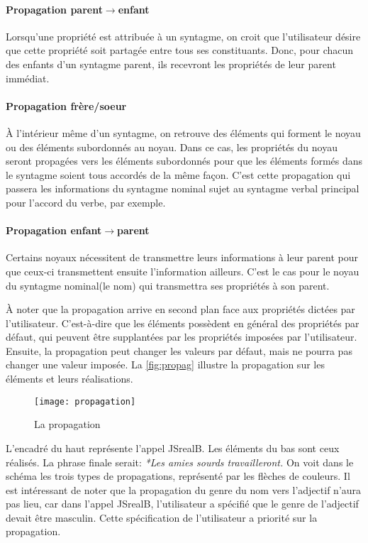 \documentclass[11pt]{article} %
\newcommand{\system}[1]{\textsf{#1}}
\newcommand{\JSB}{\system{JSrealB}}
\newcommand{\real}[1]{\emph{#1}}
\begin{document}
\paragraph{Propagation parent$\rightarrow$enfant}

Lorsqu'une propriété est attribuée à un syntagme, on croit que l'utilisateur
désire que cette propriété soit partagée entre tous ses constituants.
Donc, pour chacun des enfants d'un syntagme parent, ils recevront
les propriétés de leur parent immédiat.

\paragraph{Propagation frère/soeur}

À l'intérieur même d'un syntagme, on retrouve des éléments qui forment
le noyau ou des éléments subordonnés au noyau. Dans ce cas, les propriétés
du noyau seront propagées vers les éléments subordonnés pour que les
éléments formés dans le syntagme soient tous accordés de la même façon.
C'est cette propagation qui passera les informations du syntagme nominal
sujet au syntagme verbal principal pour l'accord du verbe, par exemple. 

\paragraph{Propagation enfant$\rightarrow$parent}

Certains noyaux nécessitent de transmettre leurs informations à leur
parent pour que ceux-ci transmettent ensuite l'information ailleurs.
C'est le cas pour le noyau du syntagme nominal(le nom) qui transmettra
ses propriétés à son parent.

À noter que la propagation arrive en second plan face aux propriétés
dictées par l'utilisateur. C'est-à-dire que les éléments possèdent
en général des propriétés par défaut, qui peuvent être supplantées
par les propriétés imposées par l'utilisateur. Ensuite, la propagation
peut changer les valeurs par défaut, mais ne pourra pas changer une
valeur imposée. La \autoref{fig:propag} illustre la propagation
sur les éléments et leurs réalisations.
\begin{figure}
\centering
\caption{La propagation}
\label{fig:propag}
\texttt{[image: propagation]}
\end{figure}

L'encadré du haut représente l'appel \JSB{}. Les éléments du bas sont ceux
réalisés. La phrase finale serait: \real{*Les amies sourds travailleront.}
On voit dans le schéma les trois types de propagations, représenté
par les flèches de couleurs. Il est intéressant de noter que la propagation
du genre du nom vers l'adjectif n'aura pas lieu, car dans l'appel
\JSB{}, l'utilisateur a spécifié que le genre de l'adjectif devait
être masculin. Cette spécification de l'utilisateur a priorité sur
la propagation.
\end{document}
